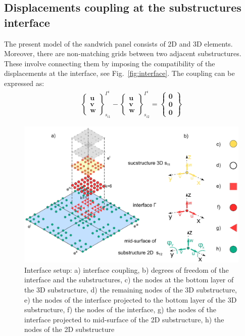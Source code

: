 \documentclass[materials,article,submit,moreauthors,pdftex]{Definitions/mdpi}
\begin{document}
{\subsection{Displacements coupling at the substructures interface}
\label{sec:interface}
The present model of the sandwich panel consists of 2D and 3D elements. 
Moreover, there are non-matching grids between two adjacent substructures. 
These involve connecting them by imposing the compatibility of the displacements at the interface, see Fig.~\ref{fig:interface}.
The coupling can be expressed as:
\begin{eqnarray}
\left\{\begin{array}{c}
\textbf{u}\\
\textbf{v}\\
\textbf{w}
\end{array}\right\}_{s_{i1}}^{\Gamma^i}-
\left\{\begin{array}{c}
\textbf{u}\\
\textbf{v}\\
\textbf{w}
\end{array}\right\}_{s_{i2}}^{\Gamma^i}=
\left\{\begin{array}{c}
\textbf{0}\\
\textbf{0}\\
\textbf{0}
\end{array}\right\}
\label{eq:coupling}
\end{eqnarray}
\begin{figure}
	\begin{center}
		\includegraphics[width=1\linewidth]{../../figures/eps/interface_2D3D.eps}
	\end{center}
	\caption{Interface setup: a) interface coupling, b) degrees of freedom of the interface and the substructures, c) the nodes at the bottom layer of the 3D substructure, d) the remaining nodes of the 3D substructure, e) the nodes of the interface projected to the bottom layer of the 3D substructure, f) the nodes of the interface, g) the nodes of the interface projected to mid-surface of the 2D substructure, h) the nodes of the 2D substructure}

\end{figure}}
\end{document}
